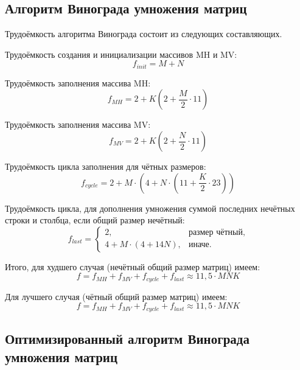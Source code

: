 \subsection{Алгоритм Винограда умножения матриц}

Трудоёмкость алгоритма Винограда состоит из следующих составляющих.

Трудоёмкость создания и инициализации массивов MH и MV:
\begin{equation}
	\label{for:init}
	f_{init} = M + N
\end{equation}

Трудоёмкость заполнения массива MH:
\begin{equation}
	\label{for:MH}
	f_{MH} = 2 + K (2 + \frac{M}{2} \cdot 11)
\end{equation}

Трудоёмкость заполнения массива MV:
\begin{equation}
	\label{for:MV}
	f_{MV} = 2 + K (2 + \frac{N}{2} \cdot 11)
\end{equation}

Трудоёмкость цикла заполнения для чётных размеров:
\begin{equation}
	\label{for:cycle}
	f_{cycle} = 2 + M \cdot (4 + N \cdot (11 + \frac{K}{2} \cdot 23))
\end{equation}

Трудоёмкость цикла, для дополнения умножения суммой последних нечётных строки и столбца, если общий размер нечётный:
\begin{equation}
	\label{for:last}
	f_{last} = \begin{cases}
		2, & \text{размер чётный,}\\
		4 + M \cdot (4 + 14N), & \text{иначе.}
	\end{cases}
\end{equation}


Итого, для худшего случая (нечётный общий размер матриц) имеем:
\begin{equation}
	\label{for:bad}
	f =  f_{MH} + f_{MV} + f_{cycle} + f_{last}\approx 11,5 \cdot MNK
\end{equation}

Для лучшего случая (чётный общий размер матриц) имеем:
\begin{equation}
	\label{for:good}
	f =  f_{MH} + f_{MV} + f_{cycle} + f_{last} \approx 11,5 \cdot MNK
\end{equation}


\subsection{Оптимизированный алгоритм Винограда умножения матриц}

